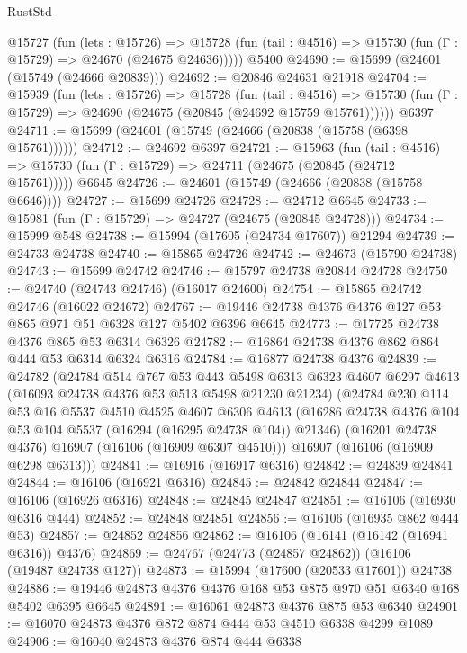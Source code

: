 \begin{lexlean}{RustStd}
\begin{coremodule}
    @15727
      (fun (lets : @15726) =>
      @15728 (fun (tail : @4516) => @15730 (fun (Γ : @15729) => @24670 (@24675 @24636)))))
    @5400
@24690 := @15699 (@24601 (@15749 (@24666 @20839)))
@24692 := @20846 @24631 @21918
@24704 := @15939
    (fun (lets : @15726) =>
    @15728
      (fun (tail : @4516) =>
      @15730 (fun (Γ : @15729) => @24690 (@24675 (@20845 (@24692 @15759 @15761))))))
    @6397
@24711 := @15699 (@24601 (@15749 (@24666 (@20838 (@15758 (@6398 @15761))))))
@24712 := @24692 @6397
@24721 := @15963
    (fun (tail : @4516) => @15730 (fun (Γ : @15729) => @24711 (@24675 (@20845 (@24712 @15761)))))
    @6645
@24726 := @24601 (@15749 (@24666 (@20838 (@15758 @6646))))
@24727 := @15699 @24726
@24728 := @24712 @6645
@24733 := @15981 (fun (Γ : @15729) => @24727 (@24675 (@20845 @24728)))
@24734 := @15999 @548
@24738 := @15994 (@17605 (@24734 @17607)) @21294
@24739 := @24733 @24738
@24740 := @15865 @24726
@24742 := @24673 (@15790 @24738)
@24743 := @15699 @24742
@24746 := @15797 @24738 @20844 @24728
@24750 := @24740 (@24743 @24746) (@16017 @24600)
@24754 := @15865 @24742 @24746 (@16022 @24672)
@24767 := @19446 @24738 @4376 @4376 @127 @53 @865 @971 @51 @6328 @127 @5402 @6396 @6645
@24773 := @17725 @24738 @4376 @865 @53 @6314 @6326
@24782 := @16864 @24738 @4376 @862 @864 @444 @53 @6314 @6324 @6316
@24784 := @16877 @24738 @4376
@24839 := @24782
    (@24784
      @514
      @767
      @53
      @443
      @5498
      @6313
      @6323
      @4607
      @6297
      @4613
      (@16093 @24738 @4376 @53 @513 @5498 @21230 @21234)
      (@24784
        @230
        @114
        @53
        @16
        @5537
        @4510
        @4525
        @4607
        @6306
        @4613
        (@16286 @24738 @4376 @104 @53 @104 @5537 (@16294 (@16295 @24738 @104)) @21346)
        (@16201 @24738 @4376)
        @16907
        (@16106 (@16909 @6307 @4510)))
      @16907
      (@16106 (@16909 @6298 @6313)))
@24841 := @16916 (@16917 @6316)
@24842 := @24839 @24841
@24844 := @16106 (@16921 @6316)
@24845 := @24842 @24844
@24847 := @16106 (@16926 @6316)
@24848 := @24845 @24847
@24851 := @16106 (@16930 @6316 @444)
@24852 := @24848 @24851
@24856 := @16106 (@16935 @862 @444 @53)
@24857 := @24852 @24856
@24862 := @16106 (@16141 (@16142 (@16941 @6316)) @4376)
@24869 := @24767 (@24773 (@24857 @24862)) (@16106 (@19487 @24738 @127))
@24873 := @15994 (@17600 (@20533 @17601)) @24738
@24886 := @19446 @24873 @4376 @4376 @168 @53 @875 @970 @51 @6340 @168 @5402 @6395 @6645
@24891 := @16061 @24873 @4376 @875 @53 @6340
@24901 := @16070 @24873 @4376 @872 @874 @444 @53 @4510 @6338 @4299 @1089
@24906 := @16040 @24873 @4376 @874 @444 @6338

\end{coremodule}
\end{lexlean}
